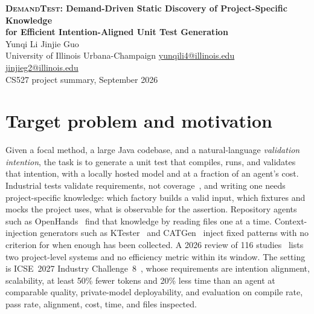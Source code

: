 \documentclass[10pt]{article}
\newcommand{\tool}{\textsc{DemandTest}\xspace}
\begin{document}
\fontsize{9.6pt}{11.3pt}\selectfont

\begin{center}
  {\LARGE\bfseries \tool: Demand-Driven Static Discovery of Project-Specific Knowledge\\[2pt] for Efficient Intention-Aligned Unit Test Generation}\\[5pt]
  {\large Yunqi Li \quad Jinjie Guo}\\[1pt]
  {\small University of Illinois Urbana-Champaign \quad
   \href{mailto:yunqili4@illinois.edu}{yunqili4@illinois.edu} \quad
   \href{mailto:jinjieg2@illinois.edu}{jinjieg2@illinois.edu}}\\[1pt]
  {\small CS527 project summary, September 2026}
\end{center}

\section*{Target problem and motivation}
Given a focal method, a large Java codebase, and a natural-language \emph{validation intention}, the task is to generate a unit test that compiles, runs, and validates that intention, with a locally hosted model and at a fraction of an agent's cost. Industrial tests validate requirements, not coverage~\cite{qi2025intentiontest}, and writing one needs project-specific knowledge: which factory builds a valid input, which fixtures and mocks the project uses, what is observable for the assertion. Repository agents such as OpenHands~\cite{wang2025openhands} find that knowledge by reading files one at a time. Context-injection generators such as KTester~\cite{li2026ktester} and CATGen~\cite{chen2026catgen} inject fixed patterns with no criterion for when enough has been collected. A 2026 review of 116 studies~\cite{zhang2026slr} lists two project-level systems and no efficiency metric within its window. The setting is ICSE~2027 Industry Challenge~8~\cite{icse27challenge8}, whose requirements are intention alignment, scalability, at least 50\% fewer tokens and 20\% less time than an agent at comparable quality, private-model deployability, and evaluation on compile rate, pass rate, alignment, cost, time, and files inspected.
\end{document}
